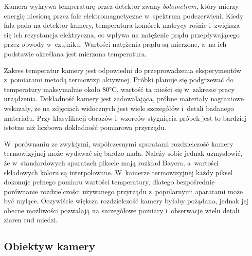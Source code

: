 Kamera wykrywa temperaturę przez detektor zwany \emph{bolometrem},
który mierzy energię niesioną przez fale elektromagnetyczne w~spektrum
podczerwieni.
Kiedy fala pada na detektor kamery, temperatura komórek matrycy rośnie
i~zwiększa się ich rezystancja elektryczna, co wpływa na natężenie prądu
przepływającego przez obwody w~czujniku.
Wartości natężenia prądu są mierzone, a~na ich podstawie określana jest
mierzona temperatura.

Zakres temperatur kamery jest odpowiedni do przeprowadzenia eksperymentów
z~pomiarami metodą termowizji aktywnej.
Próbki planuje się podgrzewać do temperatury maksymalnie około
\num{80}\si{\celsius}, wartość ta mieści się w~zakresie pracy urządzenia.
Dokładność kamery jest zadowalająca, próbne materiały nagraniowe
wskazały, że na zdjęciach widocznych jest wiele szczegółów i~detali
badanego materiału.
Przy klasyfikacji obrazów i~wzorców stygnięcia próbek jest to 
bardziej istotne niż liczbowa dokładność pomiarowa przyrządu.

W~porównaniu ze zwykłymi, współczesnymi aparatami rozdzielczość kamery
termowizyjnej może wydawać się bardzo mała.
Należy sobie jednak uzmysłowić, że w~standardowych aparatach piksele mają
rozkład Bayera, a~wartości składowych koloru są interpolowane.
W~kamerze termowizyjnej każdy piksel dokonuje pełnego pomiaru wartości
temperatury, dlatego bezpośrednie porównanie rozdzielczości używanego
przyrządu z~popularnymi aparatami może być mylące.
Oczywiście większa rozdzielczość kamery byłaby pożądana, jednak jej obecne
możliwości pozwalają na szczegółowe pomiary i~obserwacje wielu detali ziaren
rud miedzi.

\subsection{Obiektyw kamery}

